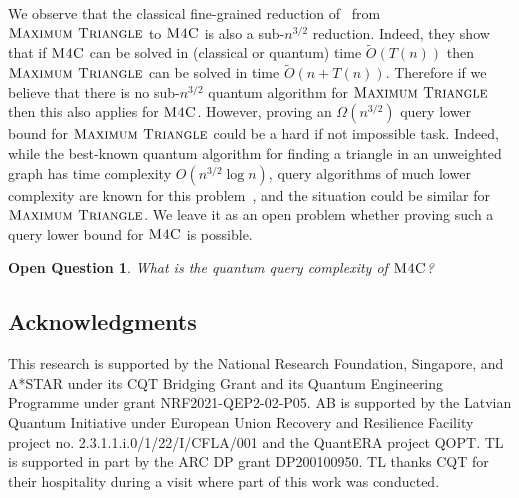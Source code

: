 \documentclass[12pt]{article}
\newcommand{\MaxT}{\textsc{Maximum Triangle}}
\newcommand{\MaxFourC}{\textsc{M4C}}
\newtheorem{openq}{Open Question}
\theoremstyle{definition}
\begin{document}
We observe that the classical fine-grained reduction of~\cite{BDT16} from $\MaxT$ to $\MaxFourC$ is also a sub-$n^{3/2}$ reduction.
Indeed, they show that if $\MaxFourC$  can be solved in (classical or quantum) time $\widetilde{O}(T(n))$ then $\MaxT$ can be solved in time $\widetilde{O}(n +T(n))$.
Therefore if we believe that there is no sub-$n^{3/2}$ quantum algorithm for $\MaxT$ then this also applies for $\MaxFourC$. However, proving an $\Omega (n^{3/2})$ query lower bound for $\MaxT$ could be a hard if not impossible task. Indeed, while the best-known quantum algorithm for finding a triangle in an unweighted graph has time complexity $O(n^{3/2} \log n)$, query algorithms of much lower complexity are known for this problem~\cite{MSS07, Bel12, LMS17, Gall14}, and the situation could be similar for $\MaxT$. 
We leave it as an open problem whether proving such a query lower bound for $\MaxFourC$ is possible.

\begin{openq}
What is the quantum query complexity of $\MaxFourC$?
\end{openq}

\subsection*{Acknowledgments}
This research is supported by the National Research Foundation, Singapore, and A*STAR under its CQT Bridging Grant and its Quantum Engineering Programme under grant NRF2021-QEP2-02-P05. AB is supported by the Latvian Quantum Initiative under European Union Recovery and Resilience Facility project no. 2.3.1.1.i.0/1/22/I/CFLA/001 and the QuantERA project QOPT.
TL is supported in part by the ARC DP grant DP200100950.  TL thanks CQT for their hospitality during a visit where part of this work was conducted.


\end{document}
